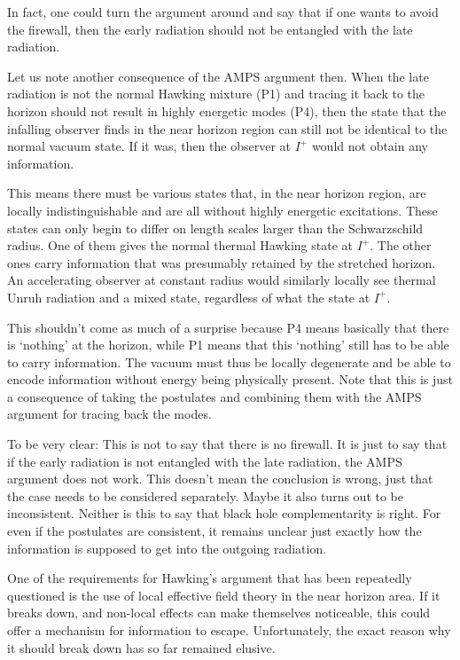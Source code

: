 \documentclass[11pt,twoside]{article}
\begin{document}
In fact, one could turn the argument around
and say that if one wants to avoid the firewall, then the early radiation
should not be entangled with the late radiation.

Let us note another consequence of the {\sc AMPS} argument then. When
the late radiation is not the normal Hawking mixture (P1) and tracing it
back to the horizon should not result in
highly energetic modes (P4), then the state that the infalling observer finds
in the near horizon region can still not be identical to the normal vacuum
state. If it was, then the observer at $I^+$ would not obtain any information.

This means
there must be various states that, in the near horizon region,
are locally indistinguishable and are all without highly energetic excitations. 
These states can only begin to differ on length scales larger than the 
Schwarzschild radius. One of them gives the normal thermal Hawking state
at $I^+$. The other ones carry information that was presumably retained
by the stretched horizon. An accelerating observer at constant
radius would similarly locally see thermal Unruh radiation and a 
mixed state, regardless of what the state at $I^+$. 

This shouldn't come as much of a surprise because P4 means
basically that there is `nothing' at the horizon, while P1 means that this
`nothing' still has to be able to carry information. The vacuum must
thus be locally degenerate and be able to encode information without
energy being physically present. Note that this is just a consequence
of taking the postulates and combining them with the {\sc AMPS} argument
for tracing back the modes. 

To be very clear: This is not to say that there is no firewall. It is
just to say that if the early radiation is not entangled with
the late radiation, the {\sc AMPS} argument does not work. This doesn't mean
the conclusion is wrong, just that the case needs to be considered
separately. Maybe it also turns out to be inconsistent. Neither is
this to say that black hole complementarity is right. For even if
the postulates are consistent, it remains unclear just exactly how 
the information is supposed to get into the outgoing radiation. 

One of the requirements for Hawking's argument that has
been repeatedly questioned \cite{Lowe:2006xm,Giddings:2007pj} is the 
use of local effective field theory in the near horizon area. If it breaks down,
and non-local effects can make themselves noticeable, this could
offer a mechanism for information to escape. Unfortunately,
the exact reason why it should break down has so far remained
elusive. 
\end{document}
